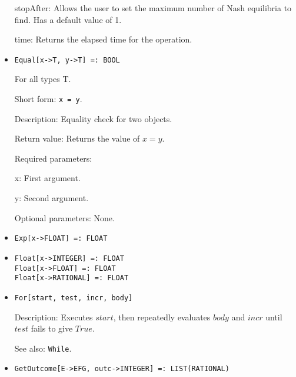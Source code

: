 \begin{itemize}
\bd
\item
[stopAfter:] Allows the user to set the maximum number of Nash equilibria to
find.  Has a default value of 1.
\item
[time:] Returns the elapsed time for the operation.
\ed
\ed

\item
\protect \large \begin{verbatim}
Equal[x->T, y->T] =: BOOL
\end{verbatim}\normalsize

For all types T.

\bd
\item
[Short form:] \verb+x = y+.
\item
[Description:] Equality check for two objects.
\item
[Return value:] Returns the value of $x = y$.
\item
[Required parameters:]\hfil\null
	
\bd
\item
[x:] First argument.
\item
[y:] Second argument.
\ed

\item
[Optional parameters:] None.

\ed

\item
\protect \large \begin{verbatim}
Exp[x->FLOAT] =: FLOAT
\end{verbatim} \normalsize



\item
\protect \large \begin{verbatim}
Float[x->INTEGER] =: FLOAT
Float[x->FLOAT] =: FLOAT
Float[x->RATIONAL] =: FLOAT
\end{verbatim} \normalsize


\item
\protect \large \begin{verbatim}
For[start, test, incr, body]
\end{verbatim}\normalsize

\bd
\item
[Description:] Executes $start$, then repeatedly evaluates $body$ and $incr$
until $test$ fails to give $True$.
\item
[See also:] \verb+While+.
\ed


\item
\protect \large \begin{verbatim}
GetOutcome[E->EFG, outc->INTEGER] =: LIST(RATIONAL)
\end{verbatim}\normalsize


\end{itemize}
